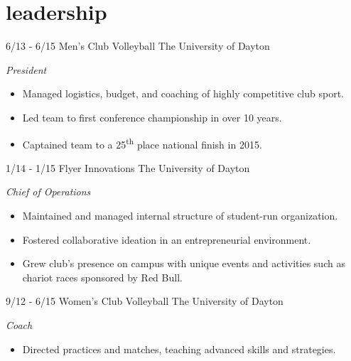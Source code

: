 \documentclass[print]{resume}
\begin{document}
\section{leadership}
\begin{entrylist}

\entry
{6/13 - 6/15}
{Men's Club Volleyball}
{The University of Dayton}
{
\emph{President}
\begin{itemize}
    \item Managed logistics, budget, and coaching of highly competitive club sport.
    \item Led team to first conference championship in over 10 years. 
    \item Captained team to a 25\textsuperscript{th} place national finish in 2015.
\end{itemize}
}

\entry
{1/14 - 1/15}
{Flyer Innovations}
{The University of Dayton}
{
\emph{Chief of Operations} 
\begin{itemize}
    \item Maintained and managed internal structure of student-run organization. 
    \item Fostered collaborative ideation in an entrepreneurial environment. 
    \item Grew club's presence on campus with unique events and activities such as chariot 
    races sponsored by Red Bull.
\end{itemize}
}

\entry
{9/12 - 6/15}
{Women's Club Volleyball}
{The University of Dayton}
{
\emph{Coach}
\begin{itemize}
    \item Directed practices and matches, teaching advanced skills and strategies.
\end{itemize}
}

\end{entrylist}

\end{document}
